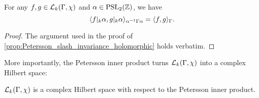     \begin{proposition}\label{prop:Petersson_slash_invariance_Maass}
      For any $f,g \in \mathcal{L}_{k}(\Gamma,\chi)$ and $\alpha \in \mathrm{PSL}_{2}(\mathbb{Z})$, we have
      \[
        \langle f|_{k}\alpha,g|_{k}\alpha\rangle_{\alpha^{-1}\Gamma\alpha} = \langle f,g\rangle_{\Gamma}.
      \]
    \end{proposition}
    \begin{proof}
      The argument used in the proof of \cref{prop:Petersson_slash_invariance_holomorphic} holds verbatim.
    \end{proof}
    
    More importantly, the Petersson inner product turns $\mathcal{L}_{k}(\Gamma,\chi)$ into a complex Hilbert space:

    \begin{proposition}
      $\mathcal{L}_{k}(\Gamma,\chi)$ is a complex Hilbert space with respect to the Petersson inner product.
    \end{proposition}
